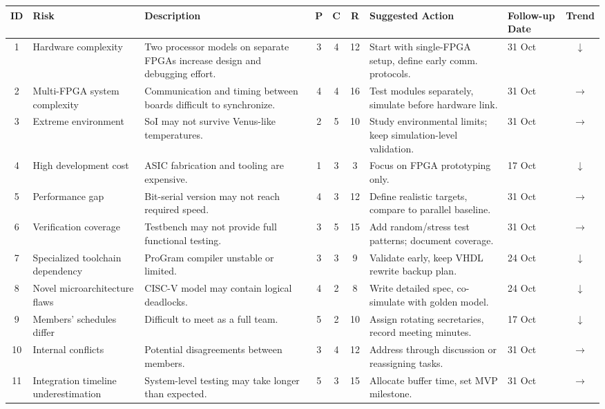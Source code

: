 \documentclass[10pt]{article}
\begin{document}
\begin{table}[h!]
\centering
\begin{tabular}{|c|p{2.35cm}|p{4.1cm}|c|c|c|p{4.3cm}|p{1.17cm}|c|}
\hline
\textbf{ID} & \textbf{Risk} & \textbf{Description} & \textbf{P} & \textbf{C} & \textbf{R} & \textbf{Suggested Action} & \textbf{Follow-up Date} & \textbf{Trend} \\
\hline
1 & Hardware complexity & Two processor models on separate FPGAs increase design and debugging effort. & 3 & 4 & 12 & Start with single-FPGA setup, define early comm. protocols. & 31 Oct & $\downarrow$ \\
\hline
2 & Multi-FPGA system complexity & Communication and timing between boards difficult to synchronize. & 4 & 4 & 16 & Test modules separately, simulate before hardware link. & 31 Oct & $\rightarrow$ \\
\hline
3 & Extreme environment & SoI may not survive Venus-like temperatures. & 2 & 5 & 10 & Study environmental limits; keep simulation-level validation. & 31 Oct & $\rightarrow$ \\
\hline
4 & High development cost & ASIC fabrication and tooling are expensive. & 1 & 3 & 3 & Focus on FPGA prototyping only. & 17 Oct & $\downarrow$ \\
\hline
5 & Performance gap & Bit-serial version may not reach required speed. & 4 & 3 & 12 & Define realistic targets, compare to parallel baseline. & 31 Oct & $\rightarrow$ \\
\hline
6 & Verification coverage & Testbench may not provide full functional testing. & 3 & 5 & 15 & Add random/stress test patterns; document coverage. & 31 Oct & $\rightarrow$ \\
\hline
7 & Specialized toolchain dependency & ProGram compiler unstable or limited. & 3 & 3 & 9 & Validate early, keep VHDL rewrite backup plan. & 24 Oct & $\downarrow$ \\
\hline
8 & Novel microarchitecture flaws & CISC-V model may contain logical deadlocks. & 4 & 2 & 8 & Write detailed spec, co-simulate with golden model. & 24 Oct & $\downarrow$ \\
\hline
9 & Members’ schedules differ & Difficult to meet as a full team. & 5 & 2 & 10 & Assign rotating secretaries, record meeting minutes. & 17 Oct & $\downarrow$ \\
\hline
10 & Internal conflicts & Potential disagreements between members. & 3 & 4 & 12 & Address through discussion or reassigning tasks. & 31 Oct & $\rightarrow$ \\
\hline
11 & Integration timeline underestimation & System-level testing may take longer than expected. & 5 & 3 & 15 & Allocate buffer time, set MVP milestone. & 31 Oct & $\rightarrow$ \\

\end{tabular}
\end{table}
\end{document}
